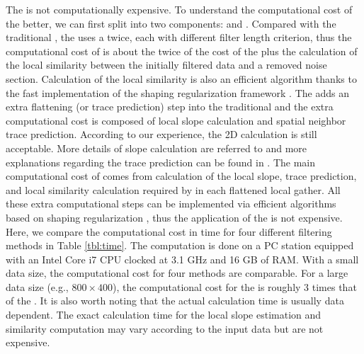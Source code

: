The  is not computationally expensive. To understand the computational cost of the  better, we can first split  into two components:  and . Compared with the traditional , the  uses a  twice, each with different filter length criterion, thus the computational cost of  is about the twice of the cost of the  plus the calculation of the local similarity between the initially filtered data and a removed noise section. Calculation of the local similarity is also an efficient algorithm thanks to the fast implementation of the shaping regularization framework \cite[]{fomel2007localattr}. The  adds an extra flattening (or trace prediction) step into the traditional  and the extra computational cost is composed of local slope calculation and spatial neighbor trace prediction. According to our experience, the 2D calculation is still acceptable. More details of slope calculation are referred to \cite{fomel2002pwd} and more explanations regarding the trace prediction can be found in \cite{liuyang2010}. The main computational cost of  comes from calculation of the local slope, trace prediction, and local similarity calculation required by  in each flattened local gather. All these extra computational steps can be implemented via efficient algorithms based on shaping regularization \cite[]{fomel2007shape}, thus the application of the  is not expensive. Here, we compare the computational cost in time for four different filtering methods in Table \ref{tbl:time}. The computation is done on a PC station equipped with an Intel Core i7 CPU clocked at 3.1 GHz and 16 GB of RAM. With a small data size, the computational cost for four methods are comparable. For a large data size (e.g., $800 \times 400$), the computational cost for the  is roughly 3 times that of the . It is also worth noting that the actual calculation time is usually data dependent. The exact calculation time for the local slope estimation and similarity computation may vary according to the input data but are not expensive. 


